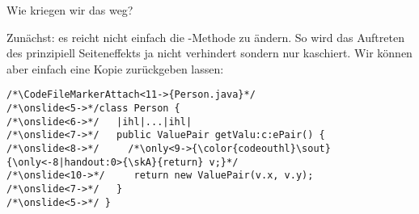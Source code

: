 {{\begin{frame}[fragile]{Wie kriegen wir das weg?}
\begin{enumerate}[<+(1)->]
    Zunächst: es reicht nicht einfach die -Methode zu ändern. So wird das Auftreten des prinzipiell Seiteneffekts ja nicht verhindert sondern nur kaschiert. \pause
    Wir können aber einfach  eine Kopie zurückgeben lassen:\vspace*{-3mm}
\columns[c,onlytextwidth]
\begin{verbatim}
/*\CodeFileMarkerAttach<11->{Person.java}*/
/*\onslide<5->*/class Person {
/*\onslide<6->*/   |ihl|...|ihl|
/*\onslide<7->*/   public ValuePair getValu:c:ePair() {
/*\onslide<8->*/     /*\only<9->{\color{codeouthl}\sout}{\only<-8|handout:0>{\skA}{return} v;}*/
/*\onslide<10->*/     return new ValuePair(v.x, v.y);
/*\onslide<7->*/   }
/*\onslide<5->*/ }
\end{verbatim}
\endcolumns
\end{enumerate}
\end{frame}
}

}
